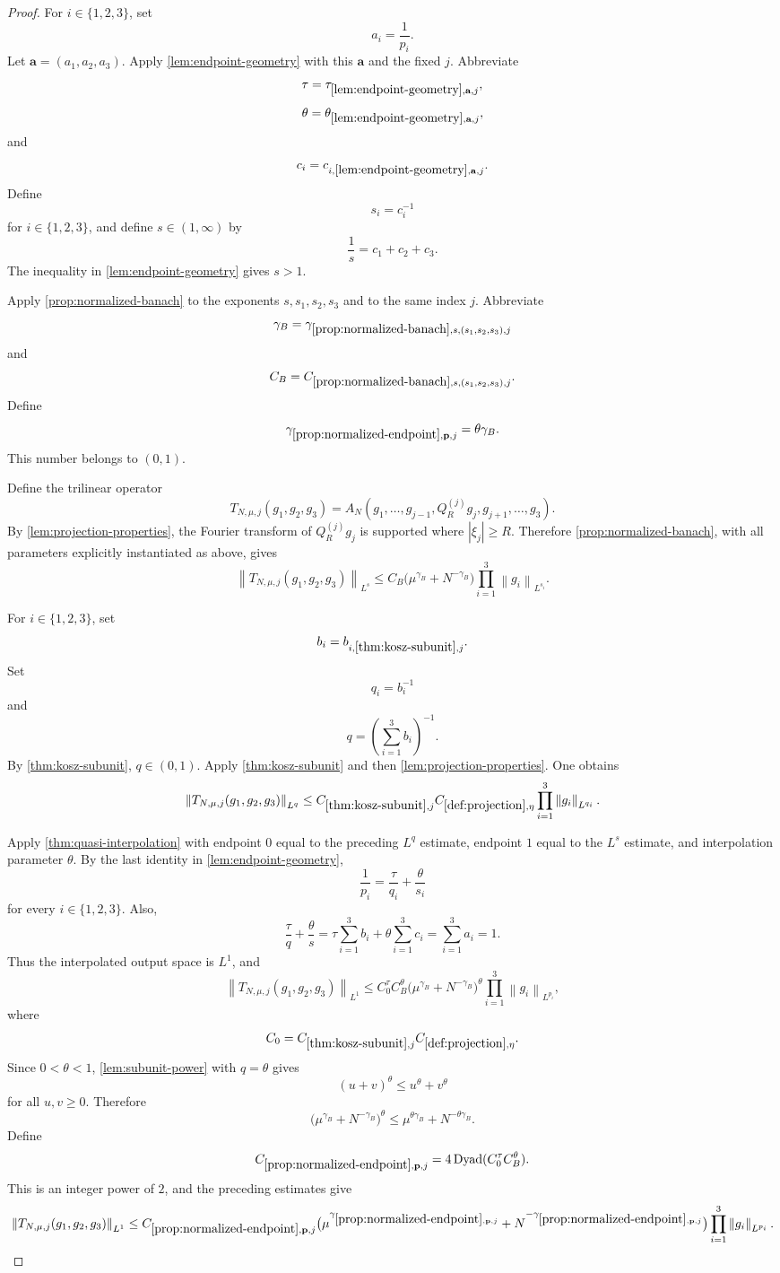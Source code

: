 \documentclass[11pt]{article}
\newcommand{\Dyad}{\operatorname{Dyad}}
\newcommand{\norm}[2]{\left\lVert #1\right\rVert_{#2}}
\newcommand{\Cst}[2]{C_{\ref{#1},#2}}
\newcommand{\Gam}[2]{\gamma_{\ref{#1},#2}}
\newcommand{\abs}[1]{\left|#1\right|}
\newcommand{\indices}{\{1,2,3\}}
\begin{document}
\begin{proof}
For \(i\in\indices\), set
\[
a_i=\frac1{p_i}.
\]
Let \(\mathbf a=(a_1,a_2,a_3)\).  Apply \cref{lem:endpoint-geometry} with this \(\mathbf a\) and the fixed \(j\).  Abbreviate
\[
\tau=\tau_{\ref{lem:endpoint-geometry},\mathbf a,j},
\]
\[
\theta=\theta_{\ref{lem:endpoint-geometry},\mathbf a,j},
\]
and
\[
c_i=c_{i,\ref{lem:endpoint-geometry},\mathbf a,j}.
\]
Define
\[
s_i=c_i^{-1}
\]
for \(i\in\indices\), and define \(s\in(1,\infty)\) by
\[
\frac1s=c_1+c_2+c_3.
\]
The inequality in \cref{lem:endpoint-geometry} gives \(s>1\).

Apply \cref{prop:normalized-banach} to the exponents \(s,s_1,s_2,s_3\) and to the same index \(j\).  Abbreviate
\[
\gamma_B=\Gam{prop:normalized-banach}{s,(s_1,s_2,s_3),j}
\]
and
\[
C_B=\Cst{prop:normalized-banach}{s,(s_1,s_2,s_3),j}.
\]
Define
\[
\Gam{prop:normalized-endpoint}{\mathbf p,j}=\theta\gamma_B.
\]
This number belongs to \((0,1)\).

Define the trilinear operator
\[
T_{N,\mu,j}(g_1,g_2,g_3)
=
A_N(g_1,\ldots,g_{j-1},Q_R^{(j)}g_j,g_{j+1},\ldots,g_3).
\]
By \cref{lem:projection-properties}, the Fourier transform of \(Q_R^{(j)}g_j\) is supported where \(\abs{\xi_j}\geq R\).  Therefore \cref{prop:normalized-banach}, with all parameters explicitly instantiated as above, gives
\[
\norm{T_{N,\mu,j}(g_1,g_2,g_3)}{L^s}
\leq
C_B\bigl(\mu^{\gamma_B}+N^{-\gamma_B}\bigr)
\prod_{i=1}^{3}\norm{g_i}{L^{s_i}}.
\]

For \(i\in\indices\), set
\[
b_i=b_{i,\ref{thm:kosz-subunit},j}.
\]
Set
\[
q_i=b_i^{-1}
\]
and
\[
q=\left(\sum_{i=1}^{3}b_i\right)^{-1}.
\]
By \cref{thm:kosz-subunit}, \(q\in(0,1)\).  Apply \cref{thm:kosz-subunit} and then \cref{lem:projection-properties}.  One obtains
\[
\norm{T_{N,\mu,j}(g_1,g_2,g_3)}{L^q}
\leq
\Cst{thm:kosz-subunit}{j}\Cst{def:projection}{\eta}
\prod_{i=1}^{3}\norm{g_i}{L^{q_i}}.
\]

Apply \cref{thm:quasi-interpolation} with endpoint \(0\) equal to the preceding \(L^q\) estimate, endpoint \(1\) equal to the \(L^s\) estimate, and interpolation parameter \(\theta\).  By the last identity in \cref{lem:endpoint-geometry},
\[
\frac1{p_i}=\frac\tau{q_i}+\frac\theta{s_i}
\]
for every \(i\in\indices\).  Also,
\[
\frac\tau q+\frac\theta s
=
\tau\sum_{i=1}^{3}b_i+\theta\sum_{i=1}^{3}c_i
=
\sum_{i=1}^{3}a_i
=
1.
\]
Thus the interpolated output space is \(L^1\), and
\[
\norm{T_{N,\mu,j}(g_1,g_2,g_3)}{L^1}
\leq
C_0^\tau C_B^\theta
\bigl(\mu^{\gamma_B}+N^{-\gamma_B}\bigr)^\theta
\prod_{i=1}^{3}\norm{g_i}{L^{p_i}},
\]
where
\[
C_0=\Cst{thm:kosz-subunit}{j}\Cst{def:projection}{\eta}.
\]
Since \(0<\theta<1\), \cref{lem:subunit-power} with \(q=\theta\) gives
\[
(u+v)^\theta\leq u^\theta+v^\theta
\]
for all \(u,v\geq0\).  Therefore
\[
\bigl(\mu^{\gamma_B}+N^{-\gamma_B}\bigr)^\theta
\leq
\mu^{\theta\gamma_B}+N^{-\theta\gamma_B}.
\]
Define
\[
\Cst{prop:normalized-endpoint}{\mathbf p,j}
=
4\Dyad(C_0^\tau C_B^\theta).
\]
This is an integer power of \(2\), and the preceding estimates give
\[
\norm{T_{N,\mu,j}(g_1,g_2,g_3)}{L^1}
\leq
\Cst{prop:normalized-endpoint}{\mathbf p,j}
\bigl(\mu^{\Gam{prop:normalized-endpoint}{\mathbf p,j}}
+N^{-\Gam{prop:normalized-endpoint}{\mathbf p,j}}\bigr)
\prod_{i=1}^{3}\norm{g_i}{L^{p_i}}.
\]


\end{proof}
\end{document}
